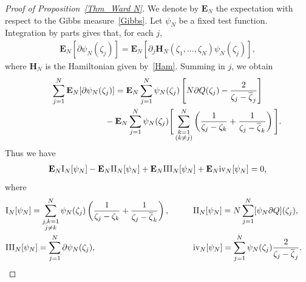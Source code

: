 \documentclass[pdftex]{sigma}
\numberwithin{equation}{section}
\newcommand{\I}{{\mathrm{I}}}
\newcommand{\II}{{\mathrm{II}}}
\newcommand{\III}{{\mathrm{III}}}
\newcommand{\E}{{\mathbf E}}
\newcommand{\Ham}{\mathbf{H}}
\renewcommand{\d}{{\partial}}
\newcommand{\1}{\chi}
\newcommand{\RN}[1]{%
	\textup{\uppercase\expandafter{\romannumeral#1}}%
}
\begin{document}
\begin{proof}[Proof of Proposition~\ref{Thm_Ward N}]
	We denote by $\E_N$ the expectation with respect to the Gibbs measure~\eqref{Gibbs}. Let $\psi_N$ be a fixed test function.	
	Integration by parts gives that, for each $j$,
	\begin{gather*}
		\E_N[\d\psi_N(\zeta_j)]= \E_N[\d_j\Ham_N(\zeta_1,\dots,\zeta_N)\psi_N(\zeta_j)],
	\end{gather*}
	where $\Ham_N$ is the Hamiltonian given by~\eqref{Ham}.
	Summing in $j$, we obtain
	\begin{gather*}
\sum_{j=1}^N\E_N [\d\psi_N(\zeta_j)]= \E_N\sum_{j=1}^N\psi_N(\zeta_j)\left[N\d Q(\zeta_j)- \frac{2}{\zeta_j-\overline{\zeta}_j} \right]
			\\
\hphantom{\sum_{j=1}^N\E_N [\d\psi_N(\zeta_j)]=}{} -\E_N\sum_{j=1}^N\psi_N(\zeta_j)\Bigg[\sum_{ \substack{k=1 \\ (k\ne j)}}^N \left(\frac {1}{\zeta_j-\zeta_k}+\frac{1}{\zeta_j-\overline{\zeta}_k}\right)\Bigg].
		\end{gather*}
	Thus we have
	\begin{gather} \label{Ward N}
		\E_N \I_N[\psi_N]-\E_N \II_N[\psi_N] +\E_N \III_N[\psi_N]+\E_N \RN{4}_N[\psi_N]=0,
	\end{gather}
	where
	\begin{alignat*}{3}
&			\I_N[\psi_N]=\sum_{\substack{j,k=1\\j\ne k}}^N \psi_N(\zeta_j) \left(\frac {1}{\zeta_j-\zeta_k}+\frac{1}{\zeta_j-\overline{\zeta}_k}\right), \qquad&&
			\II_N[\psi_N]=N\sum_{j=1}^N [\psi_N\d Q](\zeta_j),& \\
&			\III_N[\psi_N]=\sum_{j=1}^N\d\psi_N(\zeta_j), \qquad&&
			\RN{4}_N[\psi_N]=\sum_{j=1}^N \psi_N(\zeta_j) \frac{2}{\zeta_j-\overline{\zeta}_j} .&
	\end{alignat*}
	

\end{proof}
\end{document}
